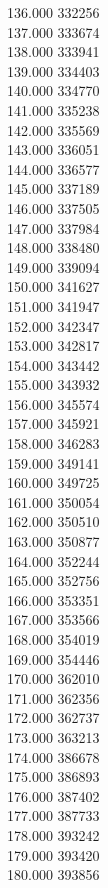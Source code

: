 { 136.000	332256 \\
 137.000	333674 \\
 138.000	333941 \\
 139.000	334403 \\
 140.000	334770 \\
 141.000	335238 \\
 142.000	335569 \\
 143.000	336051 \\
 144.000	336577 \\
 145.000	337189 \\
 146.000	337505 \\
 147.000	337984 \\
 148.000	338480 \\
 149.000	339094 \\
 150.000	341627 \\
 151.000	341947 \\
 152.000	342347 \\
 153.000	342817 \\
 154.000	343442 \\
 155.000	343932 \\
 156.000	345574 \\
 157.000	345921 \\
 158.000	346283 \\
 159.000	349141 \\
 160.000	349725 \\
 161.000	350054 \\
 162.000	350510 \\
 163.000	350877 \\
 164.000	352244 \\
 165.000	352756 \\
 166.000	353351 \\
 167.000	353566 \\
 168.000	354019 \\
 169.000	354446 \\
 170.000	362010 \\
 171.000	362356 \\
 172.000	362737 \\
 173.000	363213 \\
 174.000	386678 \\
 175.000	386893 \\
 176.000	387402 \\
 177.000	387733 \\
 178.000	393242 \\
 179.000	393420 \\
 180.000	393856 \\
}
